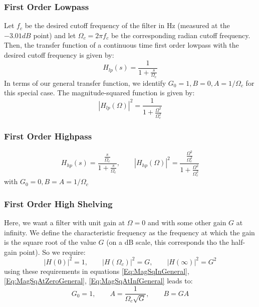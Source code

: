 \subsubsection{First Order Lowpass}
Let $f_c$ be the desired cutoff frequency of the filter in Hz (measured at the $-3.01 dB$ point) and let $\Omega_c = 2 \pi f_c$ be the corresponding radian cutoff frequency. Then, the transfer function of a continuous time first order lowpass with the desired cutoff frequency is given by:
\begin{equation}
 H_{lp}(s) = \frac{1}{1 + \frac{s}{\Omega_c} }
\end{equation}
In terms of our general transfer function, we identify $G_0 = 1, B = 0, A = 1/\Omega_c$ for this special case. The magnitude-squared function is given by:
\begin{equation}
 \label{Eq:MagSqAtInfLowpass}
 |H_{lp}(\Omega)|^2 = \frac{1}{1 + \frac{\Omega^2}{\Omega_c^2} }
\end{equation}

\subsubsection{First Order Highpass}
\begin{equation}
 H_{hp}(s) = \frac{\frac{s}{\Omega_c}}{1 + \frac{s}{\Omega_c} }, \qquad 
 |H_{hp}(\Omega)|^2 = \frac{ \frac{\Omega^2}{\Omega_c^2} }{ 1 + \frac{\Omega^2}{\Omega_c^2} }
\end{equation}
with $G_0 = 0, B = A = 1 / \Omega_c$

\subsubsection{First Order High Shelving}
Here, we want a filter with unit gain at $\Omega = 0$ and with some other gain $G$ at infinity. We define the characteristic frequency as the frequency at which the gain is the square root of the value $G$ (on a dB scale, this corresponds tho the half-gain point). So we require:
\begin{equation}
 |H(0)|^2 = 1, \qquad |H(\Omega_c)|^2 = G, \qquad |H(\infty)|^2 = G^2
\end{equation}
using these requirements in equations \ref{Eq:MagSqInGeneral}, \ref{Eq:MagSqAtZeroGeneral}, \ref{Eq:MagSqAtInfGeneral} leads to:
\begin{equation}
 G_0 = 1, \qquad A = \frac{1}{\Omega_c\sqrt{G}}, \qquad B = G A
\end{equation}

